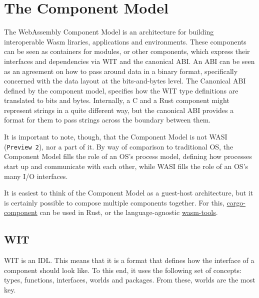 \chapter{The Component Model}
\label{chap:component_model}


The WebAssembly Component Model is an architecture for building interoperable \gls{Wasm} liraries, applications and environments. These components can be seen as containers for modules, or other components, which express their interfaces and dependencies via \gls{WIT} and the canonical \gls{ABI}. 
An \gls{ABI} can be seen as an agreement on how to pass around data in a binary format, specifically concerned with the data layout at the bits-and-bytes level. The Canonical \gls{ABI} defined by the component model, specifies how the \gls{WIT} type definitions are translated to bits and bytes. Internally, a C and a Rust component might represent strings in a quite different way, but the canonical \gls{ABI} provides a format for them to pass strings across the boundary between them.

It is important to note, though, that the Component Model is not \gls{WASI} (\texttt{Preview 2}), nor a part of it. By way of comparison to traditional \gls{OS}, the Component Model fills the role of an \gls{OS}'s process model, defining how processes start up and communicate with each other, while \gls{WASI} fills the role of an \gls{OS}'s many I/O interfaces.

It is easiest to think of the Component Model as a guest-host architecture, but it is certainly possible to compose multiple components together. For this, \href{https://github.com/bytecodealliance/cargo-component}{cargo-component} can be used in Rust, or the language-agnostic \href{https://github.com/bytecodealliance/wasm-tools}{wasm-tools}.

\section{WIT}
\label{sec:wit}

\gls{WIT} is an \gls{IDL}. This means that it is a format that defines how the interface of a component should look like. To this end, it uses the following set of concepts: types, functions, interfaces, worlds and packages. From these, worlds are the most key.

